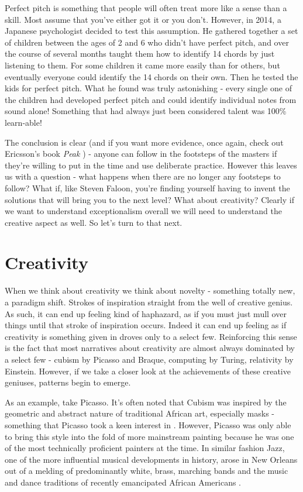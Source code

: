 \documentclass[11pt,a5paper]{book}
\begin{document}
Perfect pitch is something that people will often treat more like a sense than a skill. Most assume that you've either got it or you don't. However, in 2014, a Japanese psychologist decided to test this assumption. He gathered together a set of children between the ages of 2 and 6 who didn't have perfect pitch, and over the course of several months taught them how to identify 14 chords by just listening to them. For some children it came more easily than for others, but eventually everyone could identify the 14 chords on their own. Then he tested the kids for perfect pitch. What he found was truly astonishing - every single one of the children had developed perfect pitch and could identify individual notes from sound alone! Something that had always just been considered talent was 100\% learn-able!
\newline

The conclusion is clear (and if you want more evidence, once again, check out Ericsson's book \textit{Peak} \cite{ericsson}) - anyone can follow in the footsteps of the masters if they're willing to put in the time and use deliberate practice. However this leaves us with a question - what happens when there are no longer any footsteps to follow? What if, like Steven Faloon, you're finding yourself having to invent the solutions that will bring you to the next level? What about creativity? Clearly if we want to understand exceptionalism overall we will need to understand the creative aspect as well. So let's turn to that next. 

\section{Creativity}
When we think about creativity we think about novelty - something totally new, a paradigm shift. Strokes of inspiration straight from the well of creative genius. As such, it can end up feeling kind of haphazard, as if you must just mull over things until that stroke of inspiration occurs. Indeed it can end up feeling as if creativity is something given in droves only to a select few. Reinforcing this sense is the fact that most narratives about creativity are almost always dominated by a select few - cubism by Picasso and Braque, computing by Turing, relativity by Einstein. However, if we take a closer look at the achievements of these creative geniuses, patterns begin to emerge. 
\newline

As an example, take Picasso. It's often noted that Cubism was inspired by the geometric and abstract nature of traditional African art, especially masks - something that Picasso took a keen interest in \cite{sabine}. However, Picasso was only able to bring this style into the fold of more mainstream painting because he was one of the most technically proficient painters at the time. In similar fashion Jazz, one of the more influential musical developments in history, arose in New Orleans out of a melding of predominantly white, brass, marching bands and the music and dance traditions of recently emancipated African Americans \cite{jazz}.
\newline
\end{document}
